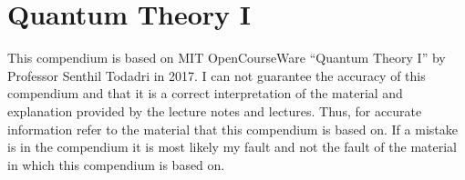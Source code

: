 \chapter{Quantum Theory I}
This compendium is based on MIT OpenCourseWare ``Quantum Theory I'' by Professor Senthil Todadri in 2017.
I can not guarantee the accuracy of this compendium and that it is a correct interpretation of the material and explanation provided by the lecture notes and lectures. Thus, for accurate information refer to the material that this compendium is based on. If a mistake is in the compendium it is most likely my fault and not the fault of the material in which this compendium is based on.


